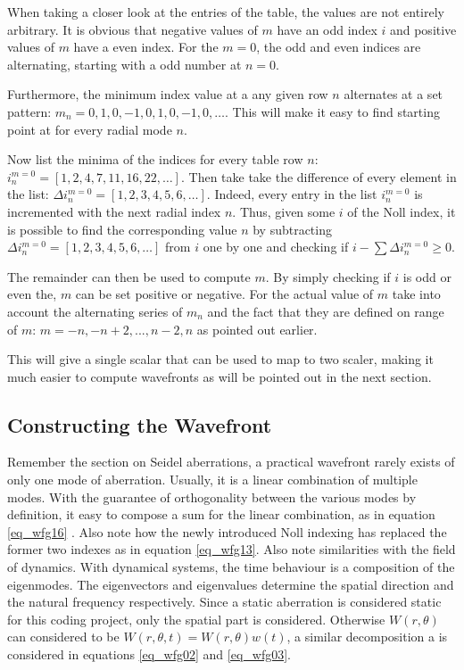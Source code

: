 \documentclass{article}
\begin{document}
When taking a closer look at the entries of the table, the values are not entirely arbitrary. It is obvious that negative values of $m$ have an odd index $i$ and positive values of $m$ have a even index. For the $m=0$, the odd and even indices are alternating, starting with a odd number at $n=0$.

Furthermore, the minimum index value at a any given row $n$ alternates at a set pattern: $m_n = 0,1,0,-1,0,1,0,-1,0,\dots$. This will make it easy to find starting point at for every radial mode $n$.

Now list the minima of the indices for every table row $n$: $i_{n}^{m=0} = [1,2,4,7,11,16,22,\dots]$. Then take take the difference of every element in the list: $\Delta i_{n}^{m=0} = [1,2,3,4,5,6,\dots]$. Indeed, every entry in the list $i_{n}^{m=0}$ is incremented with the next radial index $n$.
Thus, given some $i$ of the Noll index, it is possible to find the corresponding value $n$ by subtracting $\Delta i_{n}^{m=0} = [1,2,3,4,5,6,\dots]$ from $i$ one by one and checking if $i - \sum \Delta i_{n}^{m=0} \geq 0$.

The remainder can then be used to compute $m$.  By simply checking if $i$ is odd or even the, $m$ can be set positive or negative. For the actual value of $m$ take into account the alternating series of $m_n$ and the fact that they are defined on  range of $m$: $m = -n, -n+2,...,n-2,n$ as pointed out earlier.

This will give a single scalar that can be used to map to two scaler, making it much easier to compute wavefronts as will be pointed out in the next section. 


\newpage
\subsection{Constructing the Wavefront}
Remember the section on Seidel aberrations, a practical wavefront rarely exists of only one mode of aberration. Usually, it is a linear combination of multiple modes. With the guarantee of orthogonality between the various modes by definition, it easy to compose a sum for the linear combination, as in equation \ref{eq_wfg16} \cite{zernikeMatlabPag}. Also note how the newly introduced Noll indexing has replaced the former two indexes as in equation \ref{eq_wfg13}. Also note similarities with the field of dynamics. With dynamical systems, the time behaviour is a composition of the eigenmodes. The eigenvectors and eigenvalues determine the spatial direction and the natural frequency respectively. Since a static aberration is considered static for this coding project, only the spatial part is considered. Otherwise $W(r,\theta)$ can considered to be $W(r,\theta,t) = W(r,\theta)w(t)$, a similar decomposition a is considered in equations \ref{eq_wfg02} and \ref{eq_wfg03}.
\end{document}
